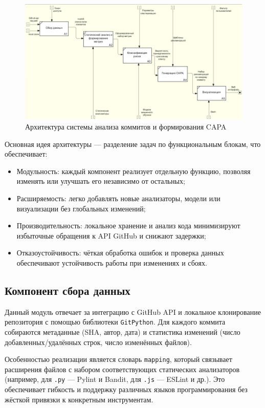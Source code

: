 \begin{figure}[ht]
	\centering
	\includegraphics[width=\textwidth]{my_folder/images/idef0.png}
	\caption{Архитектура системы анализа коммитов и формирования CAPA}
	\label{fig:architecture_diagram}
\end{figure}

Основная идея архитектуры — разделение задач по функциональным блокам, что обеспечивает:

\begin{itemize}
	\item Модульность: каждый компонент реализует отдельную функцию, позволяя изменять или улучшать его независимо от остальных;
	\item Расширяемость: легко добавлять новые анализаторы, модели или визуализации без глобальных изменений;
	\item Производительность: локальное хранение и анализ кода минимизируют избыточные обращения к API GitHub и снижают задержки;
	\item Отказоустойчивость: чёткая обработка ошибок и проверка данных обеспечивают устойчивость работы при изменениях и сбоях.
\end{itemize}

\subsection{Компонент сбора данных}

Данный модуль отвечает за интеграцию с GitHub API и локальное клонирование репозитория с помощью библиотеки \texttt{GitPython}. Для каждого коммита собираются метаданные (SHA, автор, дата) и статистика изменений (число добавленных/удалённых строк, число изменённых файлов).

Особенностью реализации является словарь \texttt{mapping}, который связывает расширения файлов с набором соответствующих статических анализаторов (например, для \texttt{.py} — Pylint и Bandit, для \texttt{.js} — ESLint и др.). Это обеспечивает гибкость и поддержку различных языков программирования без жёсткой привязки к конкретным инструментам.

